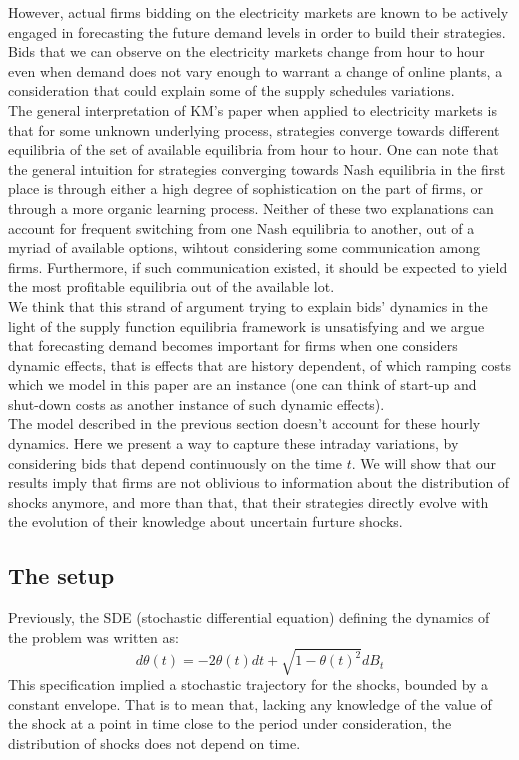 However, actual firms bidding on the electricity markets are known to be actively engaged in forecasting the future demand levels in order to build their strategies. Bids that we can observe on the electricity markets change from hour to hour even when demand does not vary enough to warrant a change of online plants, a consideration that could explain some of the supply schedules variations. \\

The general interpretation of KM's paper when applied to electricity markets is that for some unknown underlying process, strategies converge towards different equilibria of the set of available equilibria from hour to hour. One can note that the general intuition for strategies converging towards Nash equilibria in the first place is through either a high degree of sophistication on the part of firms, or through a more organic learning process. Neither of these two explanations can account for frequent switching from one Nash equilibria to another, out of a myriad of available options, wihtout considering some communication among firms. Furthermore, if such communication existed, it should be expected to yield the most profitable equilibria out of the available lot.\\ 

We think that this strand of argument trying to explain bids' dynamics in the light of the supply function equilibria framework is unsatisfying and we argue that forecasting demand becomes important for firms when one considers dynamic effects, that is effects that are history dependent, of which ramping costs which we model in this paper are an instance (one can think of start-up and shut-down costs as another instance of such dynamic effects). \\

The model described in the previous section doesn't account for these hourly dynamics. Here we present a way to capture these intraday variations, by considering bids that depend continuously on the time $t$. We will show that our results imply that firms are not oblivious to information about the distribution of shocks anymore, and more than that, that their strategies directly evolve with the evolution of their knowledge about uncertain furture shocks.\\


\subsection{The setup}\label{setupdyn}
Previously, the SDE (stochastic differential equation) defining the dynamics of the problem was written as: 
$$d\theta(t)=-2\theta(t) dt+\sqrt{1-\theta(t)^2}dB_t$$ 
This specification implied a stochastic trajectory for the shocks, bounded by a constant envelope. That is to mean that, lacking any knowledge of the value of the shock at a point in time close to the period under consideration, the distribution of shocks does not depend on time.\\

